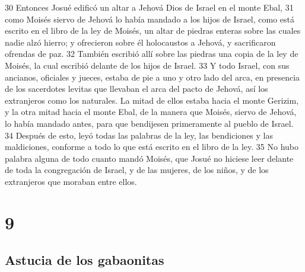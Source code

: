 30 Entonces Josué edificó un altar a Jehová Dios de Israel en el monte Ebal,
31 como Moisés siervo de Jehová lo había mandado a los hijos de Israel, como está escrito en el libro de la ley de Moisés, un altar de piedras enteras sobre las cuales nadie alzó hierro; y ofrecieron sobre él holocaustos a Jehová, y sacrificaron ofrendas de paz.
32 También escribió allí sobre las piedras una copia de la ley de Moisés, la cual escribió delante de los hijos de Israel. 
33 Y todo Israel, con sus ancianos, oficiales y jueces, estaba de pie a uno y otro lado del arca, en presencia de los sacerdotes levitas que llevaban el arca del pacto de Jehová, así los extranjeros como los naturales. La mitad de ellos estaba hacia el monte Gerizim, y la otra mitad hacia el monte Ebal, de la manera que Moisés, siervo de Jehová, lo había mandado antes, para que bendijesen primeramente al pueblo de Israel.
34 Después de esto, leyó todas las palabras de la ley, las bendiciones y las maldiciones, conforme a todo lo que está escrito en el libro de la ley.
35 No hubo palabra alguna de todo cuanto mandó Moisés, que Josué no hiciese leer delante de toda la congregación de Israel, y de las mujeres, de los niños, y de los extranjeros que moraban entre ellos. 

\chapter{9}

\section*{Astucia de los gabaonitas}

